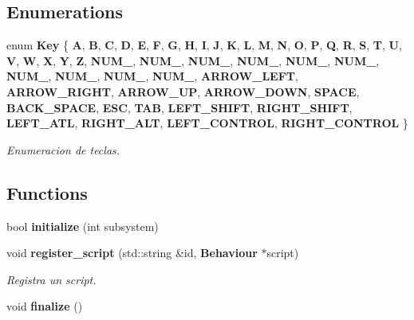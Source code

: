\subsection*{Enumerations}
\begin{DoxyCompactItemize}
\item 
enum \textbf{ Key} \{ \newline
\textbf{ A}, 
\textbf{ B}, 
\textbf{ C}, 
\textbf{ D}, 
\newline
\textbf{ E}, 
\textbf{ F}, 
\textbf{ G}, 
\textbf{ H}, 
\newline
\textbf{ I}, 
\textbf{ J}, 
\textbf{ K}, 
\textbf{ L}, 
\newline
\textbf{ M}, 
\textbf{ N}, 
\textbf{ O}, 
\textbf{ P}, 
\newline
\textbf{ Q}, 
\textbf{ R}, 
\textbf{ S}, 
\textbf{ T}, 
\newline
\textbf{ U}, 
\textbf{ V}, 
\textbf{ W}, 
\textbf{ X}, 
\newline
\textbf{ Y}, 
\textbf{ Z}, 
\textbf{ N\+U\+M\+\_}, 
\textbf{ N\+U\+M\+\_}, 
\newline
\textbf{ N\+U\+M\+\_}, 
\textbf{ N\+U\+M\+\_}, 
\textbf{ N\+U\+M\+\_}, 
\textbf{ N\+U\+M\+\_}, 
\newline
\textbf{ N\+U\+M\+\_}, 
\textbf{ N\+U\+M\+\_}, 
\textbf{ N\+U\+M\+\_}, 
\textbf{ N\+U\+M\+\_}, 
\newline
\textbf{ A\+R\+R\+O\+W\+\_\+\+L\+E\+FT}, 
\textbf{ A\+R\+R\+O\+W\+\_\+\+R\+I\+G\+HT}, 
\textbf{ A\+R\+R\+O\+W\+\_\+\+UP}, 
\textbf{ A\+R\+R\+O\+W\+\_\+\+D\+O\+WN}, 
\newline
\textbf{ S\+P\+A\+CE}, 
\textbf{ B\+A\+C\+K\+\_\+\+S\+P\+A\+CE}, 
\textbf{ E\+SC}, 
\textbf{ T\+AB}, 
\newline
\textbf{ L\+E\+F\+T\+\_\+\+S\+H\+I\+FT}, 
\textbf{ R\+I\+G\+H\+T\+\_\+\+S\+H\+I\+FT}, 
\textbf{ L\+E\+F\+T\+\_\+\+A\+TL}, 
\textbf{ R\+I\+G\+H\+T\+\_\+\+A\+LT}, 
\newline
\textbf{ L\+E\+F\+T\+\_\+\+C\+O\+N\+T\+R\+OL}, 
\textbf{ R\+I\+G\+H\+T\+\_\+\+C\+O\+N\+T\+R\+OL}
 \}
\begin{DoxyCompactList}\small\item\em Enumeracion de teclas. \end{DoxyCompactList}\end{DoxyCompactItemize}
\subsection*{Functions}
\begin{DoxyCompactItemize}
\item 
bool \textbf{ initialize} (int subsystem)
\item 
void \textbf{ register\+\_\+script} (std\+::string \&id, \textbf{ Behaviour} $\ast$script)
\begin{DoxyCompactList}\small\item\em Registra un script. \end{DoxyCompactList}\item 
void \textbf{ finalize} ()
\end{DoxyCompactItemize}
